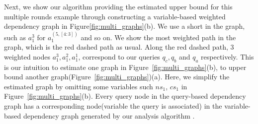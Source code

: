 Next, we show our algorithm providing the estimated upper bound for this multiple rounds example through constructing a variable-based weighted dependency graph in Figure\ref{fig:multi_graphs}(b). We use a short in the graph, such as $a_1^{3}$ for $a_1^{(5, [4:3])}$ and so on. We show the most weighted path in the graph, which is the red dashed path as usual. Along the red dashed path, $3$ weighted nodes $a_1^{3},a_1^{2},a_1^{1} $, correspond to our queries $q_c, q_b$ and $q_a$ respectively. This is our intuition to estimate one graph in Figure~\ref{fig:multi_graphs}(b), to upper bound another graph(Figure~\ref{fig:multi_graphs})(a). Here, we simplify the estimated graph by omitting some variables such $ns_1$, $cs_1$ in  Figure~\ref{fig:multi_graphs}(b).  Every query node in the query-based dependency graph has a corresponding node(variable the query is associated) in the variable-based dependency graph generated by our analysis algorithm {\THESYSTEM}. 
%
%
%
